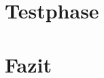 \documentclass{fhnwreport/fhnwreport}
\begin{document}
\clearpage
\section{Testphase}
\label{sec:testphase}



\clearpage
\section{Fazit}
\label{sec:fazit}



%



%
\end{document}
